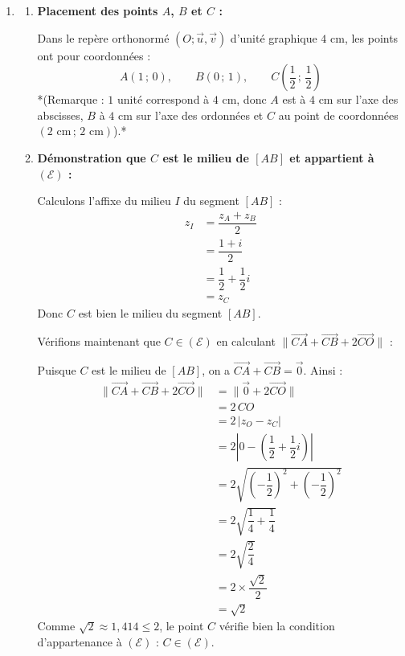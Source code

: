 \documentclass[12pt,a4paper]{article}
\begin{document}
\begin{enumerate}
    \item 
    \begin{enumerate}
        \item \textbf{Placement des points $A$, $B$ et $C$ :}
        
        Dans le repère orthonormé $(O; \vec{u}, \vec{v})$ d'unité graphique $4 \text{ cm}$, les points ont pour coordonnées :
        $$
        A(1 \,;\, 0), \qquad B(0 \,;\, 1), \qquad C\left(\dfrac{1}{2} \,;\, \dfrac{1}{2}\right)
        $$
        *(Remarque : $1$ unité correspond à $4 \text{ cm}$, donc $A$ est à $4 \text{ cm}$ sur l'axe des abscisses, $B$ à $4 \text{ cm}$ sur l'axe des ordonnées et $C$ au point de coordonnées $(2 \text{ cm} \,;\, 2 \text{ cm})$).*

        \item \textbf{Démonstration que $C$ est le milieu de $[AB]$ et appartient à $(\mathcal{E})$ :}
        
        Calculons l'affixe du milieu $I$ du segment $[AB]$ :
        $$
        \begin{aligned}
            z_I &= \dfrac{z_A + z_B}{2} \\
            &= \dfrac{1 + i}{2} \\
            &= \dfrac{1}{2} + \dfrac{1}{2}i \\
            &= z_C
        \end{aligned}
        $$
        Donc $C$ est bien le milieu du segment $[AB]$.

        \medskip
        Vérifions maintenant que $C \in (\mathcal{E})$ en calculant $\lVert \overrightarrow{CA} + \overrightarrow{CB} + 2\overrightarrow{CO} \rVert$ :
        
        Puisque $C$ est le milieu de $[AB]$, on a $\overrightarrow{CA} + \overrightarrow{CB} = \vec{0}$. Ainsi :
        $$
        \begin{aligned}
            \lVert \overrightarrow{CA} + \overrightarrow{CB} + 2\overrightarrow{CO} \rVert &= \lVert \vec{0} + 2\overrightarrow{CO} \rVert \\
            &= 2 \, CO \\
            &= 2 \, |z_O - z_C| \\
            &= 2 \left| 0 - \left(\dfrac{1}{2} + \dfrac{1}{2}i\right) \right| \\
            &= 2 \sqrt{\left(-\dfrac{1}{2}\right)^2 + \left(-\dfrac{1}{2}\right)^2} \\
            &= 2 \sqrt{\dfrac{1}{4} + \dfrac{1}{4}} \\
            &= 2 \sqrt{\dfrac{2}{4}} \\
            &= 2 \times \dfrac{\sqrt{2}}{2} \\
            &= \sqrt{2}
        \end{aligned}
        $$
        Comme $\sqrt{2} \approx 1{,}414 \le 2$, le point $C$ vérifie bien la condition d'appartenance à $(\mathcal{E})$ : $C \in (\mathcal{E})$.


\end{enumerate}
\end{enumerate}
\end{document}
